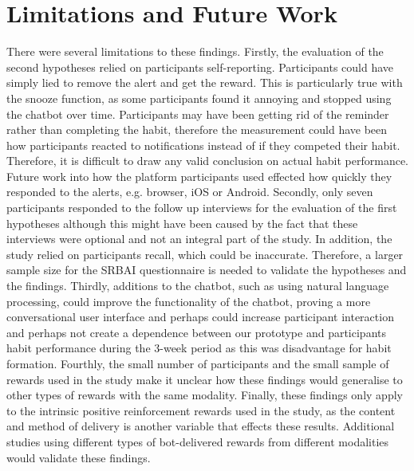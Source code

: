 
\section{Limitations and Future Work} \label{limitations_and_future_work}
There were several limitations to these findings. Firstly, the evaluation of the second hypotheses relied on participants self-reporting. Participants could have simply lied to remove the alert and get the reward. This is particularly true with the snooze function, as some participants found it annoying and stopped using the chatbot over time. Participants may have been getting rid of the reminder rather than completing the habit, therefore the measurement could have been how participants reacted to notifications instead of if they competed their habit. Therefore, it is difficult to draw any valid conclusion on actual habit performance. Future work into how the platform participants used effected how quickly they responded to the alerts, e.g. browser, iOS or Android. Secondly, only seven participants responded to the follow up interviews for the evaluation of the first hypotheses although this might have been caused by the fact that these interviews were optional and not an integral part of the study. In addition, the study relied on participants recall, which could be inaccurate. Therefore, a larger sample size for the SRBAI questionnaire is needed to validate the hypotheses and the findings. Thirdly, additions to the chatbot, such as using natural language processing, could improve the functionality of the chatbot, proving a more conversational user interface and perhaps could increase participant interaction and perhaps not create a dependence between our prototype and participants habit performance during the 3-week period as this was disadvantage for habit formation. Fourthly, the small number of participants and the small sample of rewards used in the study make it unclear how these findings would generalise to other types of rewards with the same modality. Finally, these findings only apply to the intrinsic positive reinforcement rewards used in the study, as the content and method of delivery is another variable that effects these results. Additional studies using different types of bot-delivered rewards from different modalities would validate these findings.

